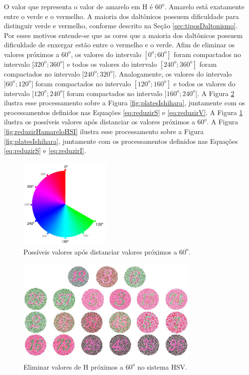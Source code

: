 \documentclass[	12pt, Times, openright, twoside, a4paper, english, brazil]{abntex2}
\begin{document}
O valor que representa o valor de amarelo em H é $60^o$. Amarelo está exatamente entre o verde e o vermelho. A maioria dos daltônicos possuem dificuldade para distinguir verde e vermelho, conforme descrito na Seção \ref{sec:tiposDaltonismo}. Por esses motivos entende-se que as cores que a maioria dos daltônicos possuem dificuldade de enxergar estão entre o vermelho e o verde. Afim de eliminar os valores próximos a $60^o$, os valores do intervalo $[0^o;60^o]$ foram compactados no intervalo $[320^o;360^o$] e todos os valores do intervalo $[240^o;360^o]$ foram compactados no intervalo $[240^o;320^o[$. Analogamente, os valores do intervalo $]60^o;120^o]$ foram compactados no intervalo $[120^o; 160^o]$ e todos os valores do intervalo $[120^o;240^o[$ foram compactados no intervalo $]160^o;240^o[$. A Figura \ref{fig:reduzirHamarelo} ilustra esse processamento sobre a Figura \ref{fig:platesIshihara}, juntamente com os processamentos definidos nas Equações \ref{eq:reduzirS} e \ref{eq:reduzirV}. A Figura \ref{fig:figuraColorsHamarelo} ilustra os possíveis valores após distanciar os valores próximos a $60^o$. A Figura \ref{fig:reduzirHamareloHSI} ilustra esse processamento sobre a Figura \ref{fig:platesIshihara}, juntamente com os processamentos definidos nas Equações \ref{eq:reduzirS} e \ref{eq:reduzirI}.

\begin{figure}[!htb]
\centering \includegraphics[width=0.40\textwidth]{figuraColorsHamarelo.PNG}
\caption{Possíveis valores após distanciar valores próximos a $60^o$.}
\label{fig:figuraColorsHamarelo}
\end{figure}

\begin{figure}[!htb]
\centering \includegraphics[width=0.80\textwidth]{figuraDeslocarAzulHSV.jpg}
\caption{Eliminar valores de H próximos a $60^o$ no sistema HSV.}
\label{fig:reduzirHamarelo}
\end{figure}
\end{document}

